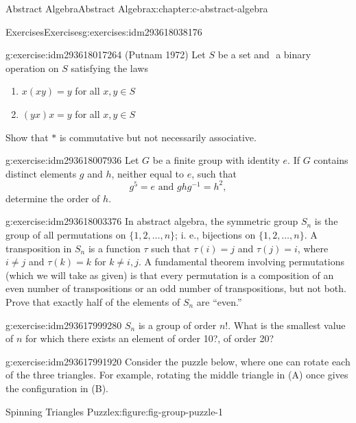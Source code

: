 \documentclass[twoside,10pt,]{book}
\numberwithin{equation}{section}
\begin{document}
\begin{chapterptx}{Abstract Algebra}{}{Abstract Algebra}{}{}{x:chapter:c-abstract-algebra}
\begin{exercises-section}{Exercises}{}{Exercises}{}{}{g:exercises:idm293618038176}
\begin{divisionexercise}{3}{}{}{g:exercise:idm293618017264}%
(Putnam 1972) Let \(S\) be a set and \(\) a binary operation on \(S\) satisfying the laws%
\begin{enumerate}[label=(\roman*)]
\item{}\(x(xy)=y\) for all \(x,y \in S\)%
\item{}\((yx)x=y\) for all \(x,y \in S\)%
\end{enumerate}
Show that \(*\) is commutative but not necessarily associative.%
\end{divisionexercise}%
\begin{divisionexercise}{4}{}{}{g:exercise:idm293618007936}%
Let \(G\) be a finite group with identity \(e\).  If \(G\) contains distinct elements \(g\) and \(h\), neither equal to \(e\), such that%
\begin{equation*}
g^5=e \textrm{  and  }g h g^{-1} = h^2,
\end{equation*}
determine the order of \(h\).%
\end{divisionexercise}%
\begin{divisionexercise}{5}{}{}{g:exercise:idm293618003376}%
%
In abstract algebra, the symmetric group \(S_n\) is the group of all permutations on \(\{1, 2, \dots, n\}\); i. e., bijections on \(\{1, 2, \dots, n\}\).  A transposition in \(S_n\) is a function \(\tau\) such that \(\tau(i)=j\) and \(\tau(j)=i\), where \(i \neq j\) and \(\tau(k)=k\) for \(k \neq i, j\).  A fundamental theorem involving permutations (which we will take as given) is that every permutation is a composition of an even number of transpositions or  an odd number of transpositions, but not both.   Prove that exactly half of the elements of \(S_n\) are ``even.''%
\end{divisionexercise}%
\begin{divisionexercise}{6}{}{}{g:exercise:idm293617999280}%
\(S_n\) is a group of order \(n!\).  What is the smallest value of \(n\) for which there exists an element of order 10?, of order 20?%
\end{divisionexercise}%
\begin{divisionexercise}{7}{}{}{g:exercise:idm293617991920}%
Consider the puzzle below, where one can rotate each of the three triangles. For example, rotating the middle triangle in (A) once gives the configuration in (B).%
\begin{figureptx}{Spinning Triangles Puzzle}{x:figure:fig-group-puzzle-1}{}%
\begin{image}{0}{1}{0}%

\end{image}
\end{figureptx}
\end{divisionexercise}
\end{exercises-section}
\end{chapterptx}
\end{document}
